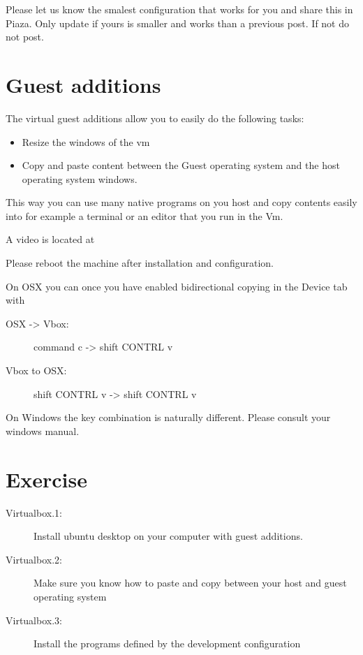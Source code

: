 Please let us know the smalest configuration that works for you and
share this in Piaza. Only update if yours is smaller and works than a
previous post. If not do not post.

\section{Guest additions}\label{guest-additions}

The virtual guest additions allow you to easily do the following tasks:

\begin{itemize}
\item  Resize the windows of the vm
\item  Copy and paste content between the Guest operating system and
  the host operating system windows.
\end{itemize}

This way you can use many native programs on you host and copy contents
easily into for example a terminal or an editor that you run in the Vm.

A video is located at



Please reboot the machine after installation and configuration.

On OSX you can once you have enabled bidirectional copying in the Device
tab with

\begin{description}
\item[OSX -\textgreater{} Vbox:] command c -\textgreater{} shift CONTRL v
\item[Vbox to OSX:]              shift CONTRL v -\textgreater{} shift CONTRL v
\end{description}

On Windows the key combination is naturally different. Please consult
your windows manual.

\section{Exercise}\label{exercise}

\begin{description}
\item[Virtualbox.1:]
Install ubuntu desktop on your computer with guest additions.
\item[Virtualbox.2:]
Make sure you know how to paste and copy between your host and guest
operating system
\item[Virtualbox.3:]
Install the programs defined by the development configuration
\end{description}
